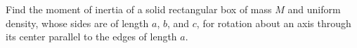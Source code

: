 Find the moment of inertia of a solid rectangular box of mass
$M$ and uniform density, whose sides are of length $a$, $b$, and $c$, for rotation about
an axis through its center parallel to the edges of length
$a$.\answercheck
